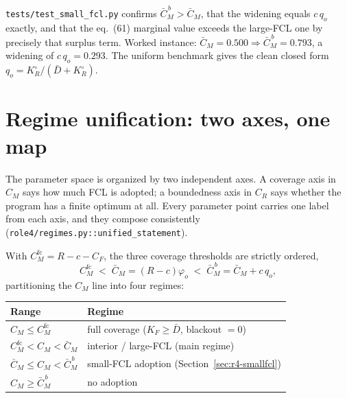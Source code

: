 \begin{remark}
\texttt{tests/test\_small\_fcl.py} confirms $\bar C_M^{\,b}>\bar C_M$, that the widening
equals $c\,q_o$ exactly, and that the eq.~(61) marginal value exceeds the large-FCL one
by precisely that surplus term. Worked instance: $\bar C_M=0.500\Rightarrow
\bar C_M^{\,b}=0.793$, a widening of $c\,q_o=0.293$. The uniform benchmark gives the
clean closed form $q_o=K_R^\circ/(\bar D+K_R^\circ)$.
\end{remark}

\section{Regime unification: two axes, one map}
\label{sec:r4-regimes}

The parameter space is organized by two independent axes. A coverage axis in $C_M$
says how much FCL is adopted; a boundedness axis in $C_R$ says whether the program has
a finite optimum at all. Every parameter point carries one label from each axis, and
they compose consistently (\texttt{role4/regimes.py::unified\_statement}).

\begin{proposition}
\label{prop:r4-coverage}
With $C_M^{\mathrm{fc}}=R-c-C_F$, the three coverage thresholds are strictly ordered,
\begin{equation}
\label{eq:r4-coverage-order}
C_M^{\mathrm{fc}} \;<\; \bar C_M=(R-c)\varphi_o \;<\; \bar C_M^{\,b}=\bar C_M+c\,q_o,
\end{equation}
partitioning the $C_M$ line into four regimes:
\begin{center}
\begin{tabular}{ll}
\hline
\textbf{Range} & \textbf{Regime} \\
\hline
$C_M \le C_M^{\mathrm{fc}}$ & full coverage ($K_F\ge\bar D$, blackout $=0$) \\
$C_M^{\mathrm{fc}} < C_M < \bar C_M$ & interior / large-FCL (main regime) \\
$\bar C_M \le C_M < \bar C_M^{\,b}$ & small-FCL adoption (Section~\ref{sec:r4-smallfcl}) \\
$C_M \ge \bar C_M^{\,b}$ & no adoption \\
\hline
\end{tabular}
\end{center}
\end{proposition}


